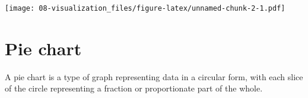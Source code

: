 \documentclass[
]{book}
\newenvironment{Shaded}{\begin{snugshade}}{\end{snugshade}}
\newcommand{\AttributeTok}[1]{\textcolor[rgb]{0.13,0.29,0.53}{#1}}
\newcommand{\CommentTok}[1]{\textcolor[rgb]{0.56,0.35,0.01}{\textit{#1}}}
\newcommand{\DecValTok}[1]{\textcolor[rgb]{0.00,0.00,0.81}{#1}}
\newcommand{\FunctionTok}[1]{\textcolor[rgb]{0.13,0.29,0.53}{\textbf{#1}}}
\newcommand{\NormalTok}[1]{#1}
\newcommand{\OtherTok}[1]{\textcolor[rgb]{0.56,0.35,0.01}{#1}}
\newcommand{\SpecialCharTok}[1]{\textcolor[rgb]{0.81,0.36,0.00}{\textbf{#1}}}
\newcommand{\StringTok}[1]{\textcolor[rgb]{0.31,0.60,0.02}{#1}}
\begin{document}
\texttt{[image: 08-visualization\_files/figure-latex/unnamed-chunk-2-1.pdf]}

\hypertarget{pie-chart}{%
\section{Pie chart}\label{pie-chart}}

A pie chart is a type of graph representing data in a circular form, with each slice of the circle representing a fraction or proportionate part of the whole.

\begin{Shaded}
\end{Shaded}
\end{document}

